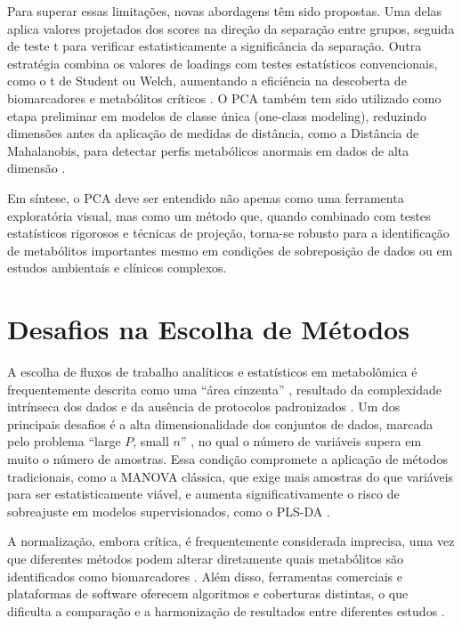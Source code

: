 Para superar essas limitações, novas abordagens têm sido propostas. Uma delas aplica valores projetados dos scores na direção da separação entre grupos, seguida de teste t para verificar estatisticamente a significância da separação. Outra estratégia combina os valores de loadings com testes estatísticos convencionais, como o t de Student ou Welch, aumentando a eficiência na descoberta de biomarcadores e metabólitos críticos \cite{mayonu2026evaluation}. O PCA também tem sido utilizado como etapa preliminar em modelos de classe única (one-class modeling), reduzindo dimensões antes da aplicação de medidas de distância, como a Distância de Mahalanobis, para detectar perfis metabólicos anormais em dados de alta dimensão \cite{brini2021improved}.

Em síntese, o PCA deve ser entendido não apenas como uma ferramenta exploratória visual, mas como um método que, quando combinado com testes estatísticos rigorosos e técnicas de projeção, torna-se robusto para a identificação de metabólitos importantes mesmo em condições de sobreposição de dados ou em estudos ambientais e clínicos complexos.


\section{\textbf{Desafios na Escolha de Métodos}}

A escolha de fluxos de trabalho analíticos e estatísticos em metabolômica é frequentemente descrita como uma “área cinzenta” \cite{de2018normalizemets}, resultado da complexidade intrínseca dos dados e da ausência de protocolos padronizados \cite{wiedmer2013selection}. Um dos principais desafios é a alta dimensionalidade dos conjuntos de dados, marcada pelo problema “large $P$, small $n$” \cite{mayonu2026evaluation}, no qual o número de variáveis supera em muito o número de amostras. Essa condição compromete a aplicação de métodos tradicionais, como a MANOVA clássica, que exige mais amostras do que variáveis para ser estatisticamente viável, e aumenta significativamente o risco de sobreajuste em modelos supervisionados, como o PLS-DA \cite{perezcova2022comparison}.

A normalização, embora crítica, é frequentemente considerada imprecisa, uma vez que diferentes métodos podem alterar diretamente quais metabólitos são identificados como biomarcadores \cite{de2018normalizemets}. Além disso, ferramentas comerciais e plataformas de software oferecem algoritmos e coberturas distintas, o que dificulta a comparação e a harmonização de resultados entre diferentes estudos \cite{datanor,li2016performance}.

